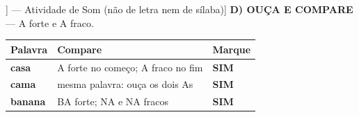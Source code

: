 \begin{exercicio}[Som /a/ fraco [[6]] --- Atividade de Som (não de letra nem de sílaba)]
\textbf{D) OUÇA E COMPARE} --- A forte e A fraco.

\begin{center}
\begin{tabular}{@{}p{4.2cm}p{6.2cm}p{1.6cm}@{}}
\hline
\textbf{Palavra} & \textbf{Compare} & \textbf{Marque} \\
\hline
\textbf{casa} & A forte no começo; A fraco no fim & \textbf{SIM} \\
\textbf{cama} & mesma palavra: ouça os dois As & \textbf{SIM} \\
\textbf{banana} & BA forte; NA e NA fracos & \textbf{SIM} \\
\hline
\end{tabular}
\end{center}

\end{exercicio}

